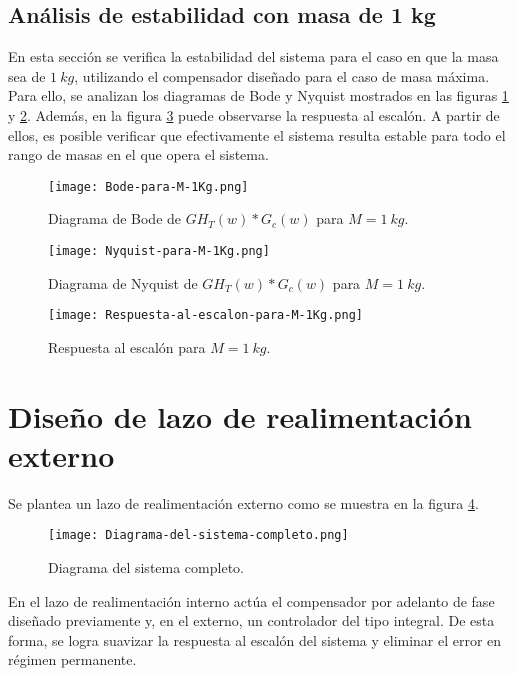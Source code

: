 \subsection{Análisis de estabilidad con masa de 1 kg}

 En esta secci\'{o}n se verifica la estabilidad del sistema  para el caso en que la masa sea de $1\:kg$, utilizando el compensador dise\~{n}ado para el caso de masa m\'{a}xima. Para ello, se analizan los diagramas de Bode y Nyquist mostrados en las figuras \ref{fig:bode-para-M-1Kg} y \ref{fig:nyquist-para-M-1Kg}. Adem\'{a}s, en la figura \ref{fig:respuesta-al-escalon-para-M-1Kg} puede observarse la respuesta al escal\'{o}n. A partir de ellos, es posible verificar que efectivamente el sistema resulta estable para todo el rango de masas en el que opera el sistema. 


\begin{figure}[H]
	\centering
	\texttt{[image: Bode-para-M-1Kg.png]}
	\caption{Diagrama de Bode de $GH_T(w)*G_c(w)$ para $M=1\:kg$.}
	\label{fig:bode-para-M-1Kg}
\end{figure}

\begin{figure}[H]
	\centering
	\texttt{[image: Nyquist-para-M-1Kg.png]}
	\caption{Diagrama de Nyquist de $GH_T(w)*G_c(w)$ para $M=1\:kg$.}
	\label{fig:nyquist-para-M-1Kg}
\end{figure}

\begin{figure}[H]
	\centering
	\texttt{[image: Respuesta-al-escalon-para-M-1Kg.png]}
	\caption{Respuesta al escalón para $M=1\:kg$.}
	\label{fig:respuesta-al-escalon-para-M-1Kg}
\end{figure}

\section{Diseño de lazo de realimentación externo}

 Se plantea un lazo de realimentaci\'{o}n externo como se muestra en la  figura \ref{fig:diagrama-del-sistema-completo}.

\begin{figure}[H]
	\centering
	\texttt{[image: Diagrama-del-sistema-completo.png]}
	\caption{Diagrama del sistema completo.}
	\label{fig:diagrama-del-sistema-completo}
\end{figure}


 En el lazo de realimentaci\'{o}n interno act\'{u}a el compensador por adelanto de fase dise\~{n}ado previamente y, en el externo, un controlador del tipo integral. De esta forma, se logra suavizar la respuesta al escal\'{o}n del sistema y eliminar el error en r\'{e}gimen permanente.


